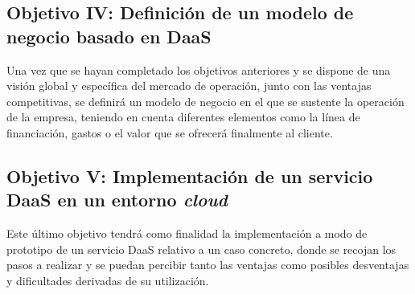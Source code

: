\subsection{Objetivo IV: Definición de un modelo de negocio basado en \acs{DaaS}}
Una vez que se hayan completado los objetivos anteriores y se dispone de una visión global y específica del mercado de operación, junto con las ventajas competitivas, se definirá un modelo de negocio en el que se sustente la operación de la empresa, teniendo en cuenta diferentes elementos como la línea de financiación, gastos o el valor que se ofrecerá finalmente al cliente.

\subsection{Objetivo V: Implementación de un servicio \acs{DaaS} en un entorno \textit{cloud}}
Este último objetivo tendrá como finalidad la implementación a modo de prototipo de un servicio \acs{DaaS} relativo a un caso concreto, donde se recojan los pasos a realizar y se puedan percibir tanto las ventajas como posibles desventajas y dificultades derivadas de su utilización.


